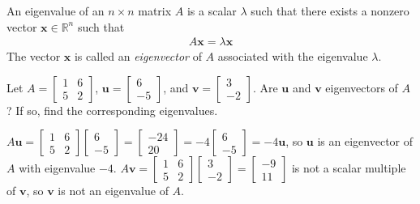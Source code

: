 \documentclass[12pt,letterpaper,reqno]{article}
\numberwithin{equation}{section}
\newcommand{\bv}{\mathbf{v}}
\newcommand{\bu}{\mathbf{u}}
\newcommand{\bx}{\mathbf{x}}
\begin{document}
\begin{defn}
An eigenvalue of an $n\times n$ matrix $A$ is a scalar $\lambda$ such that there exists a nonzero vector $\bx \in \mathbb{R}^n$ such that 
\begin{align*}
	A\bx=\lambda\bx
\end{align*}
The vector $\bx$ is called an \emph{eigenvector} of $A$ associated with the eigenvalue $\lambda$.	
\end{defn}

\begin{exercise}
Let $A=\begin{bmatrix}
	1 & 6 \\
	5 & 2
\end{bmatrix}$, $\bu=\begin{bmatrix}
	6 \\ -5
\end{bmatrix}$, and $\bv=\begin{bmatrix}
	3 \\ -2
\end{bmatrix}$. Are $\bu$ and $\bv$ eigenvectors of $A$? If so, find the corresponding eigenvalues.
\end{exercise}

{\color{red}
\begin{solution}
$A\bu=\begin{bmatrix}
			1 & 6 \\
			5 & 2
		\end{bmatrix}\begin{bmatrix}
			6 \\ -5
		\end{bmatrix}=\begin{bmatrix}
			-24 \\ 20
		\end{bmatrix}=-4\begin{bmatrix}
			6 \\ -5
		\end{bmatrix}=-4\bu$, so $\bu$ is an eigenvector of $A$ with eigenvalue $-4$. 
$A\bv=\begin{bmatrix}
			1 & 6 \\
			5 & 2
		\end{bmatrix}\begin{bmatrix}
			3 \\ -2
		\end{bmatrix}=\begin{bmatrix}
			-9 \\ 11
		\end{bmatrix}$ is not a scalar multiple of $\bv$, so $\bv$ is not an eigenvalue of $A$.
\end{solution}}
\end{document}
